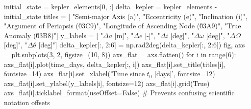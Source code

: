 {}
\markdownRendererSectionEnd \markdownRendererSectionBegin
{}\markdownRendererInterblockSeparator
{}initial_state = kepler_elements[0, :]\markdownRendererInterblockSeparator
{}
\markdownRendererSectionEnd \markdownRendererSectionBegin
{}\markdownRendererInterblockSeparator
{}delta_kepler = kepler_elements - initial_state\markdownRendererInterblockSeparator
{}
\markdownRendererSectionEnd \markdownRendererSectionBegin
{}\markdownRendererInterblockSeparator
{}
\markdownRendererSectionEnd \markdownRendererSectionBegin
{}\markdownRendererInterblockSeparator
{}titles = [ "Semi-major Axis (a)", "Eccentricity (e)", "Inclination (i)", "Argument of Periapsis (\u03C9)", "Longitude of Ascending Node (\u03A9)", "True Anomaly (\u03B8)"] y_labels = [ "$\Delta a$ [m]", "$\Delta e$ [-]", "$\Delta i$ [deg]", "$\Delta \omega$ [deg]", "$\Delta \Omega$ [deg]", "$\Delta \theta$ [deg]"]\markdownRendererInterblockSeparator
{}
\markdownRendererSectionEnd \markdownRendererSectionBegin
{}\markdownRendererInterblockSeparator
{}delta_kepler[:, 2:6] = np.rad2deg(delta_kepler[:, 2:6])\markdownRendererInterblockSeparator
{}
\markdownRendererSectionEnd \markdownRendererSectionBegin
{}\markdownRendererInterblockSeparator
{}fig, axs = plt.subplots(3, 2, figsize=(10, 8))\markdownRendererInterblockSeparator
{}
\markdownRendererSectionEnd \markdownRendererSectionBegin
{}\markdownRendererInterblockSeparator
{}
\markdownRendererSectionEnd \markdownRendererSectionBegin
{}\markdownRendererInterblockSeparator
{}axs_flat = axs.flatten() for i in range(6): axs_flat[i].plot(time_days, delta_kepler[:, i]) axs_flat[i].set_title(titles[i], fontsize=14) axs_flat[i].set_xlabel('Time since $t_0$ [days]', fontsize=12) axs_flat[i].set_ylabel(y_labels[i], fontsize=12) axs_flat[i].grid(True) axs_flat[i].ticklabel_format(useOffset=False) # Prevents confusing scientific notation offsets\markdownRendererInterblockSeparator
{}
\markdownRendererSectionEnd \markdownRendererSectionBegin
